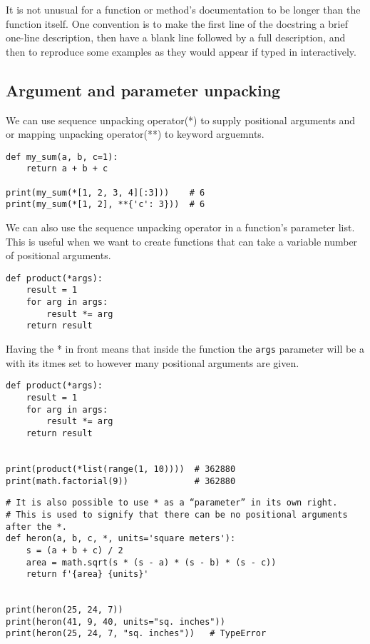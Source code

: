 \begin{tcolorbox}
It is not unusual for a function or method’s documentation to be longer than the function itself.
One convention is to make
the first line of the docstring a brief one-line description,
then have a blank line followed by a full description, and then
to reproduce some examples as they would appear if typed in interactively.
\end{tcolorbox}


\subsection{Argument and parameter unpacking}
We can use sequence unpacking operator(*) to supply positional arguments and or mapping unpacking operator(**) to keyword arguemnts.
\begin{lstlisting}
def my_sum(a, b, c=1):
    return a + b + c

print(my_sum(*[1, 2, 3, 4][:3]))    # 6
print(my_sum(*[1, 2], **{'c': 3}))  # 6  
\end{lstlisting}


We can also use the sequence unpacking operator in a function's parameter list.
This is useful when we want to create functions that can take a variable number of positional arguments.

\begin{lstlisting}
def product(*args):
    result = 1
    for arg in args:
        result *= arg
    return result  
\end{lstlisting}

Having the * in front means that inside the function the \verb|args| parameter will be a  with its itmes set to however many positional arguments are given.


\begin{lstlisting}
def product(*args):
    result = 1
    for arg in args:
        result *= arg
    return result


print(product(*list(range(1, 10))))  # 362880
print(math.factorial(9))             # 362880
\end{lstlisting}



\begin{lstlisting}
# It is also possible to use * as a “parameter” in its own right.
# This is used to signify that there can be no positional arguments after the *.
def heron(a, b, c, *, units='square meters'):
    s = (a + b + c) / 2
    area = math.sqrt(s * (s - a) * (s - b) * (s - c))
    return f'{area} {units}'


print(heron(25, 24, 7))
print(heron(41, 9, 40, units="sq. inches"))
print(heron(25, 24, 7, "sq. inches"))   # TypeError
\end{lstlisting}



